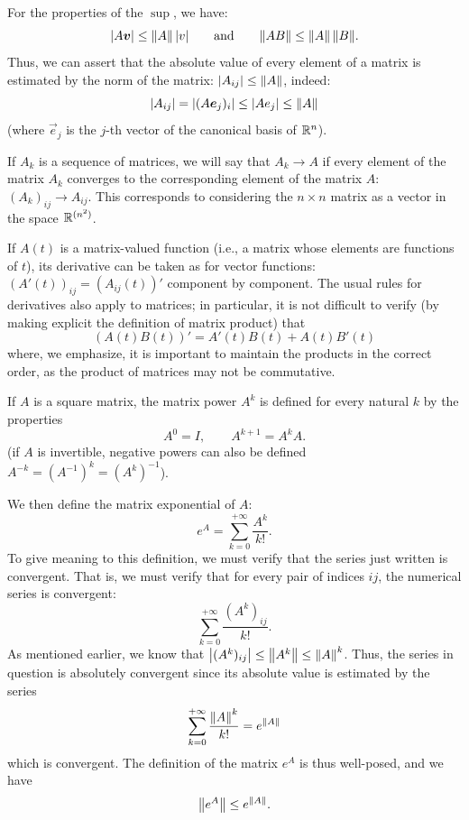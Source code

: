 For the properties of the $\sup$, we have:
\[
  {\left|A\boldsymbol v\right|} \le {\left\Vert  A \right\Vert}\, {\left| v \right|}
\qquad\text{and}\qquad
  {\left\Vert  A B \right\Vert} \le {\left\Vert  A \right\Vert} \, {\left\Vert  B \right\Vert}.
\]
Thus, we can assert that the absolute value of every element of a matrix is
estimated by the norm of the matrix: ${\left| A_{ij}\right|} \le {\left\Vert  A \right\Vert}$, indeed:
\[
  {\left| A_{ij} \right|} = {\left| (A \boldsymbol e_j)_i\right|} \le {\left| A e_j\right|}
  \le {\left\Vert  A \right\Vert}
\]
(where $\vec e_j$ is the $j$-th vector of the canonical basis of ${\mathbb R}^n$).

If $A_k$ is a sequence of matrices, we will say that $A_k\to A$ if every element
of the matrix $A_k$ converges to the corresponding element of the matrix $A$:
$(A_k)_{ij} \to A_{ij}$. This corresponds to considering the $n\times n$ matrix
as a vector in the space ${\mathbb R}^{(n^2)}$.

If $A(t)$ is a matrix-valued function (i.e., a matrix whose elements are
functions of $t$), its derivative can be taken as for vector functions:
$(A'(t))_{ij} = (A_{ij}(t))'$ component by component. The usual rules for
derivatives also apply to matrices; in particular, it is not difficult to verify
(by making explicit the definition of matrix product) that
\[
 (A(t)B(t))' = A'(t) B(t) + A(t) B'(t)
\]
where, we emphasize, it is important to maintain the products in the correct
order, as the product of matrices may not be commutative.

If $A$ is a square matrix, the matrix power $A^k$ is defined for every natural
$k$ by the properties
\[
  A^0 = I, \qquad A^{k+1} = A^kA.
\]
(if $A$ is invertible, negative powers can also be defined $A^{-k}=(A^{-1})^k =
(A^k)^{-1}$).

We then define the matrix exponential of $A$:
\[
  e^A = \sum_{k=0}^{+\infty} \frac{A^k}{k!}.
\]
To give meaning to this definition, we must verify that the series just written
is convergent. That is, we must verify that for every pair of indices $ij$, the
numerical series is convergent:
\[
 \sum_{k=0}^{+\infty} \frac{(A^k)_{ij}}{k!}.
\]
As mentioned earlier, we know that ${\left|(A^k)_{ij}\right|} \le {\left\Vert A^k\right\Vert} \le
{\left\Vert A\right\Vert}^k$. Thus, the series in question is absolutely convergent since its
absolute value is estimated by the series
\[
 \sum_{k=0}^{+\infty} \frac{{\left\Vert  A\right\Vert}^k}{k!} = e^{{\left\Vert  A\right\Vert}}
\]
which is convergent. The definition of the matrix $e^A$ is thus well-posed, and
we have
\[
 {\left\Vert  e^A\right\Vert} \le e^{{\left\Vert  A \right\Vert}}.
\]

